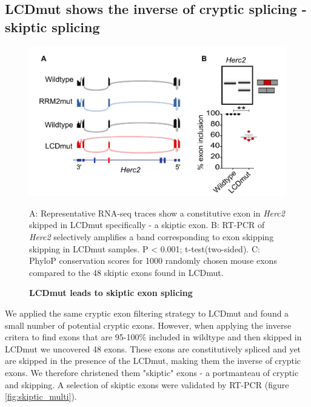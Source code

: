\subsection{LCDmut shows the inverse of cryptic splicing - skiptic splicing}

\begin{figure}[h!]
	\begin{center}
		\includegraphics[width=14cm]{Figures/05_tdp_mice/skiptic_exon_multi.png}
	\end{center}
	\caption{\textbf{LCDmut leads to skiptic exon splicing}}
	A: Representative RNA-seq traces show a constitutive exon in \textit{Herc2} skipped in LCDmut specifically - a skiptic exon. B: RT-PCR of \textit{Herc2} selectively amplifies a band corresponding to exon skipping skipping in LCDmut samples. P < 0.001; t-test(two-sided). C: PhyloP conservation scores for 1000 randomly chosen mouse exons compared to the 48 skiptic exons found in LCDmut.
	\label{skiptic_multi}
\end{figure}

We applied the same cryptic exon filtering strategy to LCDmut and found a small number of potential cryptic exons. However, when applying the inverse critera to find exons that are 95-100\% included in wildtype and then skipped in LCDmut we uncovered 48 exons. These exons are constitutively spliced and yet are skipped in the presence of the LCDmut, making them the inverse of cryptic exons. We therefore christened them "skiptic" exons - a portmanteau of cryptic and skipping. A selection of skiptic exons were validated by RT-PCR (figure \ref{fig:skiptic_multi}). 


